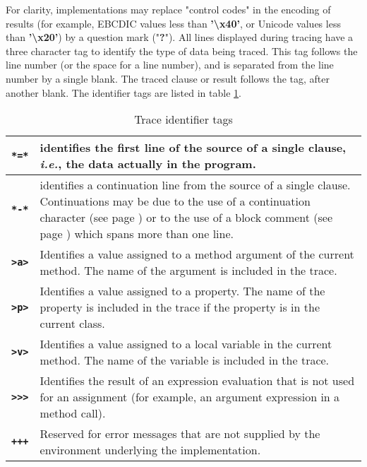 For clarity, implementations may replace "control codes"
in the encoding of results (for example, EBCDIC values less
than \textbf{'\textbackslash x40'}, or Unicode values less than
\textbf{'\textbackslash x20'})
by a question mark ("\textbf{?}").
 All lines displayed during tracing have a three character tag to
identify the type of data being traced.  This tag follows the line
number (or the space for a line number), and is separated from the line
number by a single blank.
The traced clause or result follows the tag, after another
blank.
The identifier tags are listed in table \ref{table:Trace
    Identifier Tags}.
\begin{table}\caption{Trace identifier tags}\label{table:Trace
    Identifier Tags}
\begin{tabularx}{\textwidth}{>{\bfseries}lX}
\toprule
\texttt{*=*}&
\index{*=* tracing flag,}
identifies the first line of the source of a single clause, \emph{i.e.},
the data actually in the program.
\\\midrule
\texttt{*-*}&
\index{*-* tracing flag,}
identifies a continuation line from the source of a single clause.
Continuations may be due to the use of a  continuation character (see page \pageref{refsemis}) 
or to the use of a  block comment (see page \pageref{refblockco}) 
which spans more than one line.
\\\midrule
\texttt{>a>}&
\index{>a> tracing flag,}
Identifies a value assigned to a method argument of the current
method.
The name of the argument is included in the trace.
\\\midrule
\texttt{>p>}&
\index{>p> tracing flag,}
Identifies a value assigned to a property.
The name of the property is included in the trace if the property is in
the current class.
\\\midrule
\texttt{>v>}&
\index{>v> tracing flag,}
Identifies a value assigned to a local variable in the current
method.
The name of the variable is included in the trace.
\\\midrule
\texttt{>>>}&
\index{>>> tracing flag,}
Identifies the result of an expression evaluation that is not used
for an assignment (for example, an argument expression in a method
call).
\\\midrule
\texttt{+++}&
\index{+++ tracing flag,}
Reserved for error messages that are not supplied by the environment
underlying the implementation.
\\\bottomrule
\end{tabularx}
\end{table}


